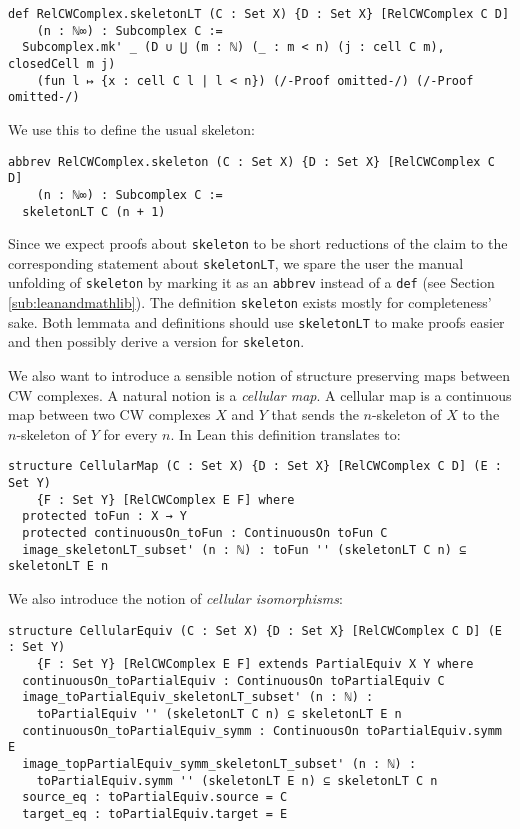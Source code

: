 \begin{lstlisting}[frame=single]
def RelCWComplex.skeletonLT (C : Set X) {D : Set X} [RelCWComplex C D] 
    (n : ℕ∞) : Subcomplex C :=
  Subcomplex.mk' _ (D ∪ ⋃ (m : ℕ) (_ : m < n) (j : cell C m), closedCell m j)
    (fun l ↦ {x : cell C l | l < n}) (/-Proof omitted-/) (/-Proof omitted-/)
\end{lstlisting}

We use this to define the usual skeleton: 

\begin{lstlisting}[frame=single]
abbrev RelCWComplex.skeleton (C : Set X) {D : Set X} [RelCWComplex C D] 
    (n : ℕ∞) : Subcomplex C :=
  skeletonLT C (n + 1)
\end{lstlisting}

Since we expect proofs about \lstinline|skeleton| to be short reductions of the claim to the corresponding statement about \lstinline|skeletonLT|, we spare the user the manual unfolding of \lstinline|skeleton| by marking it as an \lstinline|abbrev| instead of a \lstinline|def| (see Section \ref{sub:leanandmathlib}).
The definition \lstinline|skeleton| exists mostly for completeness' sake. 
Both lemmata and definitions should use \lstinline|skeletonLT| to make proofs easier and then possibly derive a version for \lstinline|skeleton|.


We also want to introduce a sensible notion of structure preserving maps between CW complexes.
A natural notion is a \emph{cellular map}. 
A cellular map is a continuous map between two CW complexes $X$ and $Y$ that sends the $n$-skeleton of $X$ to the $n$-skeleton of $Y$ for every $n$.
In Lean this definition translates to: 

\begin{lstlisting}[frame=single]
structure CellularMap (C : Set X) {D : Set X} [RelCWComplex C D] (E : Set Y) 
    {F : Set Y} [RelCWComplex E F] where
  protected toFun : X → Y
  protected continuousOn_toFun : ContinuousOn toFun C
  image_skeletonLT_subset' (n : ℕ) : toFun '' (skeletonLT C n) ⊆ skeletonLT E n
\end{lstlisting}

We also introduce the notion of \emph{cellular isomorphisms}: 

\begin{lstlisting}[frame=single]
structure CellularEquiv (C : Set X) {D : Set X} [RelCWComplex C D] (E : Set Y) 
    {F : Set Y} [RelCWComplex E F] extends PartialEquiv X Y where
  continuousOn_toPartialEquiv : ContinuousOn toPartialEquiv C
  image_toPartialEquiv_skeletonLT_subset' (n : ℕ) :
    toPartialEquiv '' (skeletonLT C n) ⊆ skeletonLT E n
  continuousOn_toPartialEquiv_symm : ContinuousOn toPartialEquiv.symm E
  image_topPartialEquiv_symm_skeletonLT_subset' (n : ℕ) :
    toPartialEquiv.symm '' (skeletonLT E n) ⊆ skeletonLT C n
  source_eq : toPartialEquiv.source = C
  target_eq : toPartialEquiv.target = E
\end{lstlisting}

